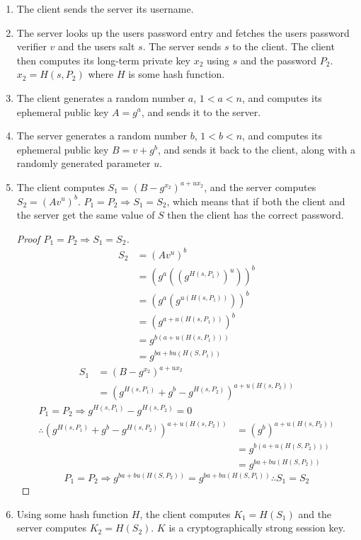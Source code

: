 \documentclass[11pt]{article}
\begin{document}
\begin{enumerate}
\item The client sends the server its username.
\item The server looks up the users password entry and fetches the users password verifier $v$ and the users salt $s$. The server sends $s$ to the client. The client then computes its long-term private key $x_2$ using $s$ and the password $P_2$. $x_2=H(s,P_2)$ where $H$ is some hash function.
\item The client generates a random number $a$, $1<a<n$, and computes its ephemeral public key $A=g^a$, and sends it to the server.
\item The server generates a random number $b$, $1<b<n$, and computes its ephemeral public key $B=v+g^b$, and sends it back to the client, along with a randomly generated parameter $u$.
\item The client computes $S_1=(B-g^{x_2})^{a+ux_2}$, and the server computes $S_2=(Av^u)^b$. 
$P_1=P_2 \Longrightarrow S_1=S_2$, which means that if both the client and the server get the same value of $S$ then the client has the correct password.
\begin{proof}[Proof $P_1=P_2 \Longrightarrow S_1=S_2$]
\begin{align*}
S_2&=(Av^u)^b\\
&=(g^a((g^{H(s,P_1)})^u))^b\\
&=(g^a(g^{u(H(s,P_1))}))^b\\
&=(g^{a+u(H(s,P_1))})^b\\
&=g^{b(a+u(H(s,P_1)))}\\
&=g^{ba+bu(H(S,P_1))}
\end{align*}
\begin{align*}
S_1&=(B-g^{x_2})^{a+ux_2}\\
&=(g^{H(s,P_1)}+g^b-g^{H(s,P_2)})^{a+u(H(s,P_2))}
\end{align*}
\begin{align*}
P_1=P_2 \Longrightarrow g^{H(s,P_1)}-g^{H(s,P_2)}=0\\
\therefore (g^{H(s,P_1)}+g^b-g^{H(s,P_2)})^{a+u(H(s,P_2))}&=(g^b)^{a+u(H(s,P_2))}\\
&=g^{b(a+u(H(S,P_2)))}\\
&=g^{ba+bu(H(S,P_2))}
\end{align*}
$$P_1=P_2 \Longrightarrow g^{ba+bu(H(S,P_2))}=g^{ba+bu(H(S,P_1))} \therefore S_1=S_2$$
\end{proof}
\item Using some hash function $H$, the client computes $K_1=H(S_1)$ and the server computes $K_2=H(S_2)$. $K$ is a cryptographically strong session key.

\end{enumerate}
\end{document}
